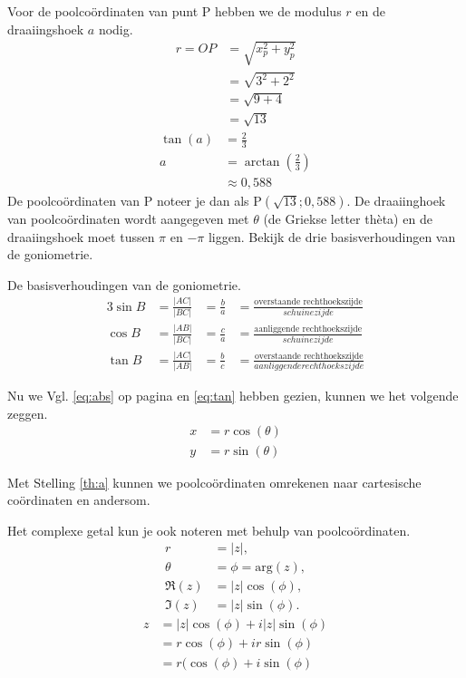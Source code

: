 \documentclass[11pt,fleqn]{book} %
\begin{document}
Voor de poolcoördinaten van punt P hebben we de modulus $r$ en de draaiingshoek $a$ nodig.
\begin{align*}
r=OP&=\sqrt{x_p^2+y_p^2}\\
&=\sqrt{3^2+2^2}\\
&=\sqrt{9+4}\\
&=\sqrt{13}
\end{align*}
\begin{align*}
\tan{(a)}&=\frac{2}{3}\\
a&=\arctan{\left(\frac{2}{3}\right)}\\
&\approx 0,588
\end{align*}
De poolcoördinaten van P noteer je dan als P$(\sqrt{13};0,588)$. De draaiinghoek van poolcoördinaten wordt aangegeven met $\theta$ (de Griekse letter thèta) en de draaiingshoek moet tussen $\pi$ en $-\pi$ liggen. Bekijk de drie basisverhoudingen van de goniometrie.
\begin{definition}
De basisverhoudingen van de goniometrie.
\\
\begin{alignat}{3}
\sin{B} &=\frac{\left|AC\right|}{\left|BC\right|} &=\frac{b}{a} &=\frac{\text{overstaande rechthoekszijde}}{schuinezijde}\\
\cos{B} &=\frac{\left|AB\right|}{\left|BC\right|} &=\frac{c}{a} &=\frac{\text{aanliggende rechthoekszijde}}{schuinezijde}\\
\tan{B} &=\frac{\left|AC\right|}{\left|AB\right|} &=\frac{b}{c} &=\frac{\text{overstaande rechthoekszijde}}{aanliggende rechthoekszijde} \label{eq:tan}
\end{alignat}
\end{definition}
\begin{theorem}\label{th:a}
Nu we Vgl. \ref{eq:abs} op pagina \pageref{eq:abs} en \ref{eq:tan} hebben gezien, kunnen we het volgende zeggen.
\begin{align*}
x &= r\cos{(\theta)}\\
y &= r\sin{(\theta)}
\end{align*}
\end{theorem}
Met Stelling \ref{th:a} kunnen we poolcoördinaten omrekenen naar cartesische coördinaten en andersom.

Het complexe getal kun je ook noteren met behulp van poolcoördinaten.
\begin{align*}
r &=\left|z\right|,\\
\theta &=\phi=\text{arg}(z),\\
\Re(z) &=\left|z\right|\cos{(\phi)},\\
\Im(z) &=\left|z\right|\sin{(\phi)}.
\end{align*}
\begin{align*}
z &=\left|z\right|\cos{(\phi)}+i\left|z\right|\sin{(\phi)}\\
&= r\cos{(\phi)}+ir\sin{(\phi)}\\
&= r(\cos{(\phi)}+i\sin{(\phi)}
\end{align*}
\end{document}
